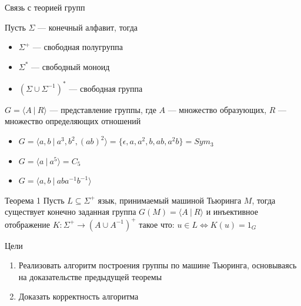 \documentclass[russian,english,hyperref=unicode]{beamer}
\begin{document}
\begin{frame}{Связь с теорией групп}
    \begin{center}
        Пусть $\Sigma$ --- конечный алфавит, тогда
    \end{center}
    \begin{itemize}
        \item $\Sigma^+$ --- свободная полугруппа
        \item $\Sigma^*$ --- свободный моноид
        \item $(\Sigma \cup \Sigma^{-1})^*$ --- свободная группа
    \end{itemize}
    \pause
    \begin{center}
        $G = \langle A~|~R \rangle$ --- представление группы, 
        где $A$ --- множество образующих, $R$ --- множество определяющих отношений
    \end{center}
    \begin{itemize}
        \item $G = \langle a, b~|~a^3, b^2, (ab)^2 \rangle = \{\epsilon, a, a^2, b, ab, a^2b\} = Sym_3$
        \item $G = \langle a~|~a^5\rangle = C_5$
        \item $G = \langle a, b~|~aba^{-1}b^{-1} \rangle$
    \end{itemize}
    \pause
    \begin{block}{Теорема 1}
		Пусть $L \subseteq \Sigma^+$ язык, принимаемый машиной Тьюринга $M$,
    тогда существует конечно заданная группа $G(M)=\langle A~|~R \rangle$
    и инъективное отображение $K: \Sigma^+ \to (A \cup A^{-1})^+$ такое что:
    $u \in L \iff K(u)=1_G$
	\end{block}
\end{frame}

\begin{frame}{Цели}
    \begin{enumerate}
        \item Реализовать алгоритм построения группы по машине Тьюринга, основываясь на доказательстве предыдущей теоремы
        \item Доказать корректность алгоритма
    \end{enumerate}
\end{frame}
\end{document}
